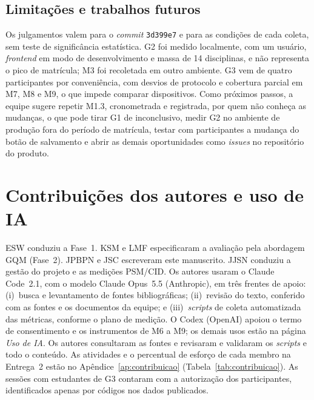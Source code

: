 \documentclass[12pt]{article}
\begin{document}
\subsection{Limitações e trabalhos futuros}\label{subsec:limitacoes}

Os julgamentos valem para o \textit{commit} \texttt{3d399e7} e para as
condições de cada coleta, sem teste de significância estatística. G2 foi medido
localmente, com um usuário, \textit{frontend} em modo de desenvolvimento e massa
de 14 disciplinas, e não representa o pico de matrícula; M3 foi recoletada em
outro ambiente. G3 vem de quatro participantes por conveniência, com desvios de
protocolo e cobertura parcial em M7, M8 e M9, o que impede comparar
dispositivos. Como próximos passos, a equipe sugere repetir M1.3, cronometrada e
registrada, por quem não conheça as mudanças, o que pode tirar G1 de inconclusivo, medir G2 no ambiente de produção fora do
período de matrícula, testar com participantes a mudança do botão de salvamento
e abrir as demais oportunidades como \textit{issues} no repositório do produto.

\section*{Contribuições dos autores e uso de IA}

ESW conduziu a Fase~1. KSM e LMF especificaram a avaliação pela abordagem GQM
(Fase~2). JPBPN e JSC escreveram este manuscrito. JJSN conduziu a gestão do
projeto e as medições PSM/CID.
Os autores usaram o Claude Code~2.1, com o modelo Claude Opus~5.5 (Anthropic),
em três frentes de apoio: (i)~busca e levantamento de fontes bibliográficas;
(ii)~revisão do texto, conferido com as fontes e os documentos da equipe; e
(iii)~\textit{scripts} de coleta automatizada das métricas, conforme o plano de
medição. O Codex (OpenAI) apoiou o termo de
consentimento e os instrumentos de M6 a M9; os demais usos estão na página
\textit{Uso de IA}. Os autores consultaram as fontes e revisaram e validaram os
\textit{scripts} e todo o conteúdo.
As atividades e o percentual de esforço de cada membro na Entrega~2 estão no
Apêndice~\ref{ap:contribuicao} (Tabela~\ref{tab:contribuicao}).
As sessões com estudantes de G3 contaram com a autorização dos participantes,
identificados apenas por códigos nos dados publicados.
\end{document}
